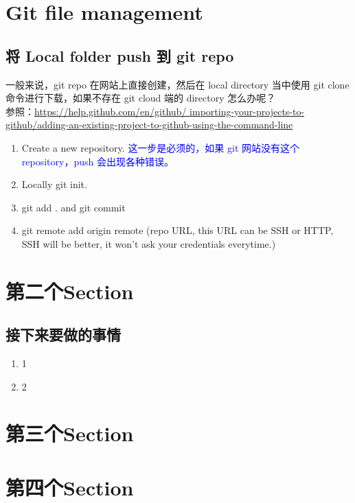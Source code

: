\documentclass[UTF8,fancyhdr,a4paper]{ctexart}
\begin{document}
\newpage
\section{Git file management}
\subsection{将 Local folder push 到 git repo}
一般来说，git repo 在网站上直接创建，然后在 local directory 当中使用 git clone 命令进行下载，如果不存在 git cloud 端的 directory 怎么办呢？\\
参照：\url{https://help.github.com/en/github/
importing-your-projects-to-github/adding-an-existing-project-to-github-using-the-command-line}
\begin{enumerate}
\item Create a new repository. \textcolor{blue}{这一步是必须的，如果 git 网站没有这个 repository，push 会出现各种错误。}
\item Locally git init.
\item git add . and git commit
\item git remote add origin remote (repo URL, this URL can be SSH or HTTP, SSH will be better, it won't ask your credentials everytime.)
\end{enumerate}


\newpage
\section{第二个Section}

\subsection{接下来要做的事情}
\begin{enumerate}
\item 1
\item 2


\end{enumerate}

\newpage
\section{第三个Section}

\newpage
\section{第四个Section}
\end{document}
